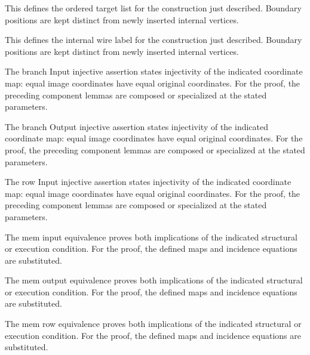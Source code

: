 This defines the ordered target list for the construction just described. Boundary positions are kept distinct from newly inserted internal vertices.
\par{}

This defines the internal wire label for the construction just described. Boundary positions are kept distinct from newly inserted internal vertices.
\par{}

The branch Input injective assertion states injectivity of the indicated coordinate map: equal image coordinates have equal original coordinates.
For the proof, the preceding component lemmas are composed or specialized at the stated parameters.
\par{}

The branch Output injective assertion states injectivity of the indicated coordinate map: equal image coordinates have equal original coordinates.
For the proof, the preceding component lemmas are composed or specialized at the stated parameters.
\par{}

The row Input injective assertion states injectivity of the indicated coordinate map: equal image coordinates have equal original coordinates.
For the proof, the preceding component lemmas are composed or specialized at the stated parameters.
\par{}

The mem input equivalence proves both implications of the indicated structural or execution condition.
For the proof, the defined maps and incidence equations are substituted.
\par{}

The mem output equivalence proves both implications of the indicated structural or execution condition.
For the proof, the defined maps and incidence equations are substituted.
\par{}

The mem row equivalence proves both implications of the indicated structural or execution condition.
For the proof, the defined maps and incidence equations are substituted.
\par{}

